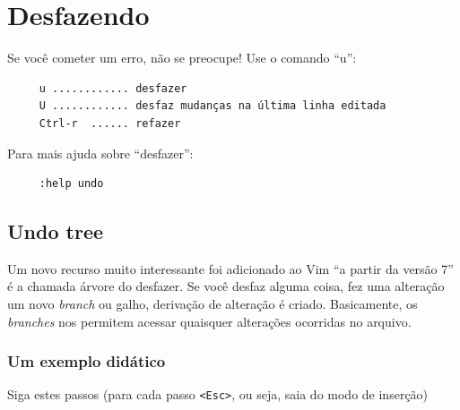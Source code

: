 \documentclass[10pt,a4paper,openany]{book}
\begin{document}
\section{Desfazendo}
\label{Desfazendo}

Se você cometer um erro, não se preocupe! Use o comando ``u'':

\begin{verbatim}
     u ............ desfazer
     U ............ desfaz mudanças na última linha editada
     Ctrl-r  ...... refazer
\end{verbatim}

Para mais ajuda sobre ``desfazer'':

\begin{verbatim}
     :help undo
\end{verbatim}

\subsection{Undo tree}
\label{Undo tree}

Um novo recurso muito interessante foi adicionado ao Vim ``a partir da
versão 7''  é a chamada árvore do desfazer.  Se
você desfaz alguma coisa, fez uma alteração um novo {\em branch} ou
galho, derivação de alteração é criado.  Basicamente, os {\em branches}
nos permitem acessar quaisquer alterações ocorridas no arquivo.

\subsubsection{Um exemplo didático}
\label{Um exemplo didático}

Siga estes passos (para cada passo \verb|<Esc>|, ou seja, saia do modo
de inserção)
\end{document}
